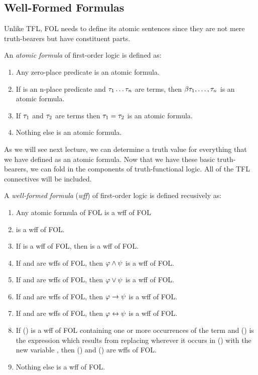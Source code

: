 \subsection{Well-Formed Formulas}

Unlike TFL, FOL needs to define its atomic sentences since they are not mere
truth-bearers but have constituent parts.

\begin{definition}
  \label{def:fol-atomic-formula}
  An \emph{atomic formula} of first-order logic is defined as:\\
  \begin{enumerate}
  \item Any zero-place predicate is an atomic formula.
  \item If \ebeta is an n-place predicate and $\tau_1\dots\tau_n$ are
    terms, then $\beta\tau_1,\dots,\tau_n$ is an atomic formula.
  \item If $\tau_1$ and $\tau_2$ are terms then $\tau_1=\tau_2$ is an
    atomic formula.
  \item Nothing else is an atomic formula. 
  \end{enumerate}
\end{definition}

As we will see next lecture, we can determine a truth value for everything that
we have defined as an atomic formula. Now that we have these basic
truth-bearers, we can fold in the components of truth-functional logic. All of
the TFL connectives will be included.

\begin{definition}
  \label{def:fol-wff}
  A \emph{well-formed formula} (\emph{wff}) of first-order logic is defined
    recusively as:\\
  \begin{enumerate}
    \item Any atomic formula of FOL is a wff of FOL
    \item \ebot is a wff  of FOL.
    \item If \ephi is a wff of FOL, then \enot\ephi is a wff of FOL.
    \item If \ephi and \epsi are wffs of FOL, then $\varphi\wedge\psi$ is a
      wff of FOL.
    \item If \ephi and \epsi are wffs of FOL, then $\varphi\vee\psi$ is a
      wff of FOL.
    \item If \ephi and \epsi are wffs of FOL, then $\varphi\rightarrow\psi$ is a
      wff of FOL.
    \item If \ephi and \epsi are wffs of FOL, then $\varphi\leftrightarrow\psi$ is a
      wff of FOL.
    \item If \ephi(\etau) is a wff of FOL containing one or more occurrences of
      the term \etau and \ephi(\exi) is the expression which results from
      replacing \etau wherever it occurs in \ephi(\etau) with the new variable
      \exi, then \eexists\exi\ephi(\exi) and \eforall\exi\ephi(\exi) are wffs of
      FOL.
    \item Nothing else is a wff of FOL.
  \end{enumerate}
\end{definition}

